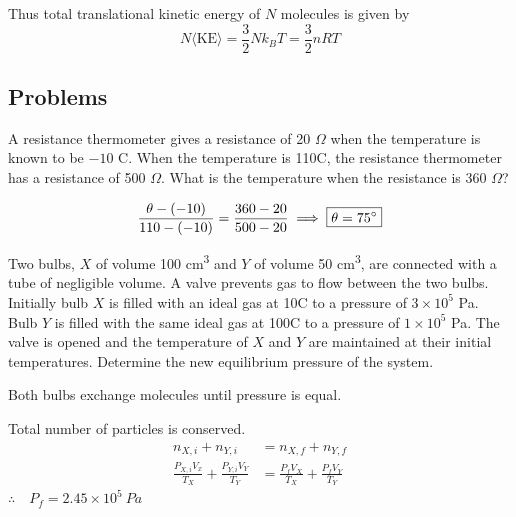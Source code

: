 Thus total translational kinetic energy of $N$ molecules is given by
\begin{equation}
N\langle\text{KE}\rangle=\frac{3}{2}Nk_BT=\frac{3}{2}nRT
\end{equation}
\pagebreak

\subsection*{Problems}
\begin{prbm}
A resistance thermometer gives a resistance of 20 $\Omega$ when the temperature is known to be $-10$ \degree C. When the temperature is 110\degree C, the resistance thermometer has a resistance of 500 $\Omega$. What is the temperature when the resistance is 360 $\Omega$?
\end{prbm}
\begin{solution}
\[ \frac{\theta-(-10)}{110-(-10)}=\frac{360-20}{500-20} \implies \boxed{\theta=75\degree} \]
\end{solution}

\begin{prbm}
Two bulbs, $X$ of volume 100 \unit{cm^3} and $Y$ of volume 50 \unit{cm^3}, are connected with a tube of negligible volume. A valve prevents gas to flow between the two bulbs. Initially bulb $X$ is filled with an ideal gas at 10\degree C to a pressure of $3\times10^5$ Pa. Bulb $Y$ is filled with the same ideal gas at 100\degree C to a pressure of $1\times10^5$ Pa. The valve is opened and the temperature of $X$ and $Y$ are maintained at their initial temperatures. Determine the new equilibrium pressure of the system.
\end{prbm}
\begin{solution}
Both bulbs exchange molecules until pressure is equal.

Total number of particles is conserved.
\begin{align*}
n_{X,i}+n_{Y,i} &= n_{X,f}+n_{Y,f} \\
\frac{P_{X,i}V_x}{T_X}+\frac{P_{Y,i}V_Y}{T_Y} &= \frac{P_fV_X}{T_X}+\frac{P_fV_Y}{T_Y}
\end{align*}
$\therefore\quad \boxed{P_f=2.45 \times 10^5\:\unit{Pa}}$
\end{solution}
\pagebreak